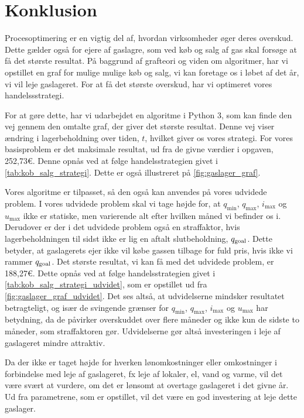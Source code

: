 \chapter{Konklusion}
Procesoptimering er en vigtig del af, hvordan virksomheder øger deres overskud. Dette gælder også for ejere af gaslagre, som ved køb og salg af gas skal forsøge at få det største resultat. På baggrund af grafteori og viden om algoritmer, har vi opstillet en graf for mulige mulige køb og salg, vi kan foretage os i løbet af det år, vi vil leje gaslageret. For at få det største overskud, har vi optimeret vores handelssstrategi. 

For at gøre dette, har vi udarbejdet en algoritme i Python 3, som kan finde den vej gennem den omtalte graf, der giver det største resultat. Denne vej viser ændring i lagerbeholdning over tiden, $t$, hvilket giver os vores strategi. For vores basisproblem er det maksimale resultat, ud fra de givne værdier i opgaven, 252,73€. Denne opnås ved at følge handelsstrategien givet i \autoref{tab:kob_salg_strategi}. Dette er også illustreret på \autoref{fig:gaslager_graf}. 

Vores algoritme er tilpasset, så den også kan anvendes på vores udvidede problem. I vores udvidede problem skal vi tage højde for, at $q_{\min}$, $q_{\max}$, $i_{\max}$ og $u_{\max}$ ikke er statiske, men varierende alt efter hvilken måned vi befinder os i. Derudover er der i det udvidede problem også en straffaktor, hvis lagerbeholdningen til sidst ikke er lig en aftalt slutbeholdning, $q_{\textrm{goal}}$. Dette betyder, at gaslagerets ejer ikke vil købe gassen tilbage for fuld pris, hvis ikke vi rammer $q_{\textrm{goal}}$. Det største resultat, vi kan få med det udvidede problem, er 188,27€. Dette opnås ved at følge handelsstrategien givet i \autoref{tab:kob_salg_strategi_udvidet}, som er opstillet ud fra \autoref{fig:gaslager_graf_udvidet}.
Det ses altså, at udvidelserne mindsker resultatet betragteligt, og især de svingende grænser for $q_{\min}$, $q_{\max}$, $i_{\max}$ og $u_{\max}$ har betydning, da de påvirker overskuddet over flere måneder og ikke kun de sidste to måneder, som straffaktoren gør. 
Udvidelserne gør altså investeringen i leje af gaslageret mindre attraktiv.

Da der ikke er taget højde for hverken lønomkostninger eller omkostninger i forbindelse med leje af gaslageret, fx leje af lokaler, el, vand og varme, vil det være svært at vurdere, om det er lønsomt at overtage gaslageret i det givne år. Ud fra parametrene, som er opstillet, vil det være en god investering at leje dette gaslager. 


